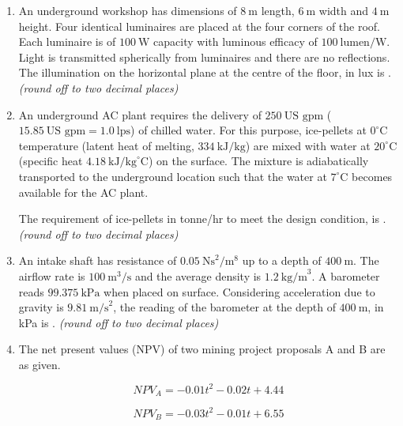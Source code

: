 \documentclass[journal,12pt,onecolumn]{IEEEtran}
\theoremstyle{remark}
\begin{document}
\begin{enumerate}
\hfill{}
\item An underground workshop has dimensions of $8 \ \text{m}$ length, $6 \ \text{m}$ width and $4 \ \text{m}$ height.  
Four identical luminaires are placed at the four corners of the roof.  
Each luminaire is of $100 \ \text{W}$ capacity with luminous efficacy of $100 \ \text{lumen/W}$.  
Light is transmitted spherically from luminaires and there are no reflections.  
The illumination on the horizontal plane at the centre of the floor, in lux is \underline{\hspace{1.5cm}}.  
\textit{(round off to two decimal places)}  

\hfill{}
\item An underground AC plant requires the delivery of $250 \ \text{US gpm}$ ($15.85 \ \text{US gpm} = 1.0 \ \text{lps}$) of chilled water.  
For this purpose, ice-pellets at $0^{\circ}\text{C}$ temperature (latent heat of melting, $334 \ \text{kJ/kg}$) are mixed with water at $20^{\circ}\text{C}$ (specific heat $4.18 \ \text{kJ/kg}^{\circ}\text{C}$) on the surface.  
The mixture is adiabatically transported to the underground location such that the water at $7^{\circ}\text{C}$ becomes available for the AC plant.  

The requirement of ice-pellets in tonne/hr to meet the design condition, is \underline{\hspace{1.5cm}}.  
\textit{(round off to two decimal places)} 


\hfill{}
\item An intake shaft has resistance of $0.05 \ \text{Ns}^2/\text{m}^8$ up to a depth of $400 \ \text{m}$.  
The airflow rate is $100 \ \text{m}^3/\text{s}$ and the average density is $1.2 \ \text{kg/m}^3$.  
A barometer reads $99.375 \ \text{kPa}$ when placed on surface.  
Considering acceleration due to gravity is $9.81 \ \text{m/s}^2$, the reading of the barometer at the depth of $400 \ \text{m}$, in kPa is \underline{\hspace{1.5cm}}.  
\textit{(round off to two decimal places)}  



\hfill{}

\item The net present values (NPV) of two mining project proposals A and B are as given.  

\[
NPV_A = -0.01t^2 - 0.02t + 4.44
\]  

\[
NPV_B = -0.03t^2 - 0.01t + 6.55
\]  


\end{enumerate}
\end{document}
